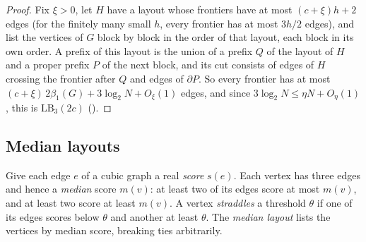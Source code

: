 \documentclass[11pt]{article}
\newcommand{\leanrefs}[1]{{\unskip\nobreak\hfil\penalty50\hskip1em\null\nobreak\hfil
  {\normalfont\small #1}\parfillskip=0pt\finalhyphendemerits=0\par}}
\newcommand{\leanref}[1]{\leanrefs{\lean{#1}}}
\theoremstyle{plain}
\theoremstyle{definition}
\theoremstyle{remark}
\newcommand{\LB}{\mathrm{LB}}
\begin{document}
\begin{proof}
Fix $\xi > 0$, let $H$ have a layout whose frontiers have at most $(c + \xi)h + 2$ edges (for the
finitely many small $h$, every frontier has at most $3h/2$ edges), and list the vertices of $G$
block by block in the order of that layout, each block in its own order. A prefix of this
layout is the union of a prefix $Q$ of the layout of $H$ and a proper prefix $P$ of the next
block, and its cut consists of edges of $H$ crossing the frontier after $Q$ and edges of
$\partial P$. So every frontier has at most
$(c + \xi)\,2\beta_1(G) + 3\log_2 N + O_\xi(1)$ edges, and since $3\log_2 N \le \eta N + O_\eta(1)$,
this is $\LB_3(2c)$ ().
\end{proof}

\subsection{Median layouts}
\label{sec:median}

Give each edge $e$ of a cubic graph a real \emph{score} $s(e)$. Each vertex has three edges and
hence a \emph{median} score $m(v)$: at least two of its edges score at most $m(v)$, and at
least two score at least $m(v)$. A vertex \emph{straddles} a threshold $\theta$ if one of its
edges scores below $\theta$ and another at least $\theta$. The \emph{median layout} lists the
vertices by median score, breaking ties arbitrarily.

\end{document}
